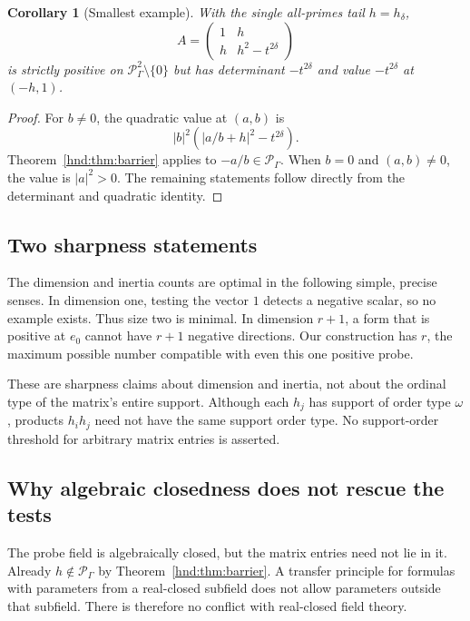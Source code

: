 \documentclass[11pt,oneside]{article}
\newtheorem{corollary}[theorem]{Corollary}
\theoremstyle{definition}
\theoremstyle{remark}
\newcommand{\Pfield}{\mathscr P_\Gamma}
\begin{document}
\begin{corollary}[Smallest example]\label{hnd:cor:smallmatrix}
With the single all-primes tail $h=h_\delta$,
\begin{equation}\label{hnd:eq:smallmatrix}
 A=\begin{pmatrix}1&h\\h&h^2-t^{2\delta}\end{pmatrix}
\end{equation}
is strictly positive on $\Pfield^2\setminus\{0\}$ but has determinant
$-t^{2\delta}$ and value $-t^{2\delta}$ at $(-h,1)$.
\end{corollary}
\begin{proof}
For $b\ne0$, the quadratic value at $(a,b)$ is
\[
 |b|^2\left(|a/b+h|^2-t^{2\delta}\right).
\]
Theorem~\ref{hnd:thm:barrier} applies to $-a/b\in\Pfield$.
When $b=0$ and $(a,b)\ne0$, the value is $|a|^2>0$.
The remaining statements follow directly from the determinant and
quadratic identity.
\end{proof}

\subsection{Two sharpness statements}

The dimension and inertia counts are optimal in the following simple,
precise senses. In dimension one, testing the vector $1$ detects a
negative scalar, so no example exists. Thus size two is minimal.
In dimension $r+1$, a form that is positive at $e_0$ cannot have
$r+1$ negative directions. Our construction has $r$, the maximum
possible number compatible with even this one positive probe.

These are sharpness claims about dimension and inertia, not about the
ordinal type of the matrix's entire support. Although each $h_j$ has
support of order type $\omega$, products $h_ih_j$ need not have the same
support order type. No support-order threshold for arbitrary matrix
entries is asserted.

\subsection{Why algebraic closedness does not rescue the tests}

The probe field is algebraically closed, but the matrix entries need
not lie in it. Already $h\notin\Pfield$ by
Theorem~\ref{hnd:thm:barrier}. A transfer principle for formulas with
parameters from a real-closed subfield does not allow parameters outside
that subfield. There is therefore no conflict with real-closed field
theory.
\end{document}
